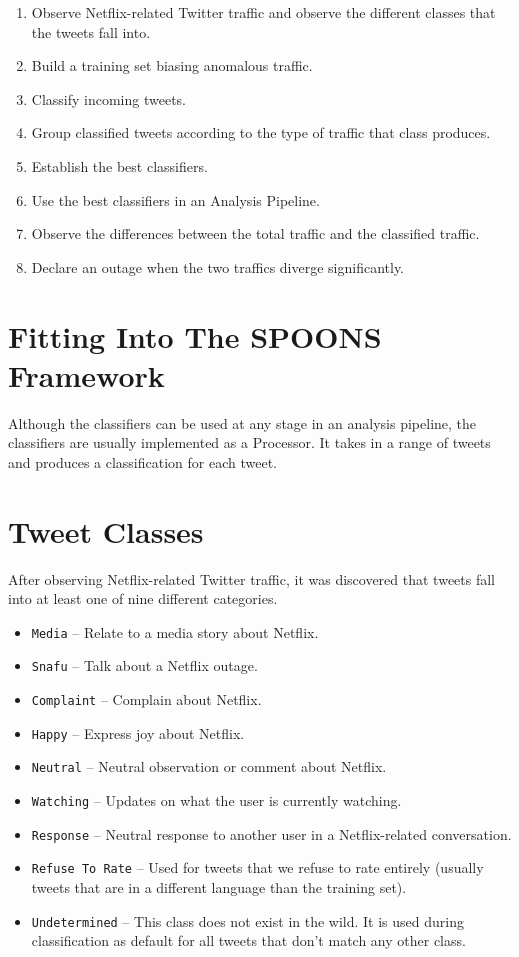 \documentclass[12pt]{ucthesis}
\begin{document}
\begin{enumerate}
   \item Observe Netflix-related Twitter traffic and observe the different classes that the tweets fall into.
   \item Build a training set biasing anomalous traffic.
   \item Classify incoming tweets.
   \item Group classified tweets according to the type of traffic that class produces.
   \item Establish the best classifiers.
   \item Use the best classifiers in an Analysis Pipeline.
   \item Observe the differences between the total traffic and the classified traffic.
   \item Declare an outage when the two traffics diverge significantly.
\end{enumerate}

\chapter{Fitting Into The SPOONS Framework}
\label{class-framework}
Although the classifiers can be used at any stage in an analysis pipeline, the classifiers are usually implemented as
a Processor. It takes in a range of tweets and produces a classification for each tweet.

\chapter{Tweet Classes}
\label{class-tweet-classes}
After observing Netflix-related Twitter traffic, it was discovered that tweets fall into at least one of nine different categories.

\begin{itemize}
  \item \texttt{Media} -- Relate to a media story about Netflix.
  \item \texttt{Snafu} -- Talk about a Netflix outage.
  \item \texttt{Complaint} -- Complain about Netflix.
  \item \texttt{Happy} -- Express joy about Netflix.
  \item \texttt{Neutral} -- Neutral observation or comment about Netflix.
  \item \texttt{Watching} -- Updates on what the user is currently watching.
  \item \texttt{Response} -- Neutral response to another user in a Netflix-related conversation.
  \item \texttt{Refuse To Rate} -- Used for tweets that we refuse to rate entirely (usually tweets that are in a different language than the training set).
  \item \texttt{Undetermined} -- This class does not exist in the wild. It is used during classification as default for all tweets that don't match any other class.
\end{itemize}
\end{document}
